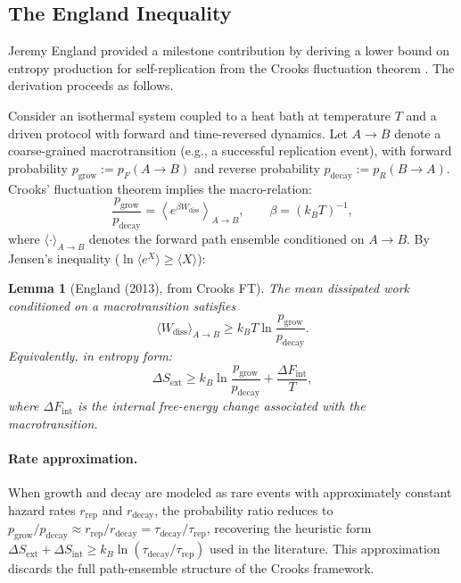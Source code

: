 \documentclass[12pt,a4paper]{article}
\newtheorem{lemma}{Lemma}
\theoremstyle{remark}
\begin{document}
\subsection{The England Inequality}

Jeremy England provided a milestone contribution by deriving a lower bound on entropy production for self-replication from the Crooks fluctuation theorem \citep{England2013}. The derivation proceeds as follows.

Consider an isothermal system coupled to a heat bath at temperature $T$ and a driven protocol with forward and time-reversed dynamics. Let $A \to B$ denote a coarse-grained macrotransition (e.g., a successful replication event), with forward probability $p_{\mathrm{grow}} := p_F(A \to B)$ and reverse probability $p_{\mathrm{decay}} := p_R(B \to A)$. Crooks' fluctuation theorem implies the macro-relation:
\begin{equation}
\frac{p_{\mathrm{grow}}}{p_{\mathrm{decay}}} = \left\langle e^{\beta W_{\mathrm{diss}}} \right\rangle_{A \to B}, \qquad \beta = (k_B T)^{-1},
\end{equation}
where $\langle \cdot \rangle_{A \to B}$ denotes the forward path ensemble conditioned on $A \to B$. By Jensen's inequality ($\ln \langle e^X \rangle \geq \langle X \rangle$):

\begin{lemma}[England (2013), from Crooks FT]
\label{lem:england}
The mean dissipated work conditioned on a macrotransition satisfies
\begin{equation}
\langle W_{\mathrm{diss}} \rangle_{A \to B} \geq k_B T \ln \frac{p_{\mathrm{grow}}}{p_{\mathrm{decay}}}.
\end{equation}
Equivalently, in entropy form:
\begin{equation}
\Delta S_{\mathrm{ext}} \geq k_B \ln \frac{p_{\mathrm{grow}}}{p_{\mathrm{decay}}} + \frac{\Delta F_{\mathrm{int}}}{T},
\end{equation}
where $\Delta F_{\mathrm{int}}$ is the internal free-energy change associated with the macrotransition.
\end{lemma}

\paragraph{Rate approximation.} When growth and decay are modeled as rare events with approximately constant hazard rates $r_{\mathrm{rep}}$ and $r_{\mathrm{decay}}$, the probability ratio reduces to $p_{\mathrm{grow}} / p_{\mathrm{decay}} \approx r_{\mathrm{rep}} / r_{\mathrm{decay}} = \tau_{\mathrm{decay}} / \tau_{\mathrm{rep}}$, recovering the heuristic form $\Delta S_{\mathrm{ext}} + \Delta S_{\mathrm{int}} \geq k_B \ln(\tau_{\mathrm{decay}} / \tau_{\mathrm{rep}})$ used in the literature. This approximation discards the full path-ensemble structure of the Crooks framework.
\end{document}
